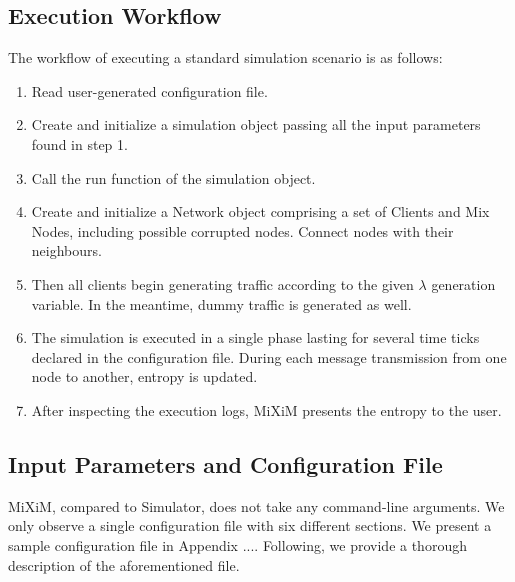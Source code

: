 \documentclass[logo,msc,cyber]{infthesis}   %
\begin{document}
\subsection{Execution Workflow}

The workflow of executing a standard simulation scenario is as follows:

\begin{enumerate}
    \item Read user-generated configuration file.
    \item Create and initialize a simulation object passing all the input
    parameters found in step 1.
    \item Call the run function of the simulation object.
    \item Create and initialize a Network object comprising a set of Clients and
    Mix Nodes, including possible corrupted nodes. Connect nodes with their
    neighbours.
    \item Then all clients begin generating traffic according to the given $\lambda$
    generation variable. In the meantime, dummy traffic is generated as well.
    \item The simulation is executed in a single phase lasting for several time
    ticks declared in the configuration file. During each message transmission
    from one node to another, entropy is updated.
    \item After inspecting the execution logs, MiXiM presents the entropy to the user.
\end{enumerate}

\subsection{Input Parameters and Configuration File}

MiXiM, compared to Simulator, does not take any command-line arguments. We only
observe a single configuration file with six different sections. We present a
sample configuration file in Appendix .... Following, we provide a thorough
description of the aforementioned file.
\end{document}
